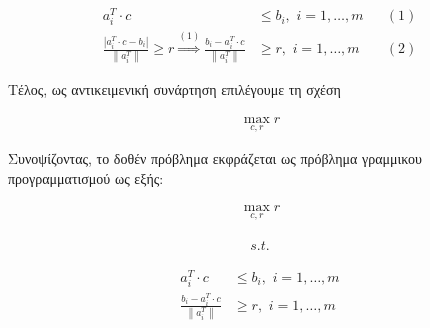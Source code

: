 \documentclass[12pt]{article}
\newcommand{\centered}[1]{\begin{align*}#1\end{align*}}
\newcommand{\margin}{\hspace{4pt}}
\newcommand{\norm}[1]{\left\lVert#1\right\rVert}
\newcommand{\abs}[1]{\left\lvert#1\right\rvert}
\begin{document}
\begin{align*}
    a^{T}_{i} \cdot c & \leq b_i, \margin i = 1, \dotsc, m && (1)\\
    \frac{\abs{a^{T}_{i} \cdot c - b_i}}{\norm{a^{T}_{i}}} \geq r
    \stackrel{(1)}{\Rightarrow}\frac{b_i - a^{T}_{i} \cdot c}{\norm{a^{T}_{i}}} & \geq r, \margin i = 1, \dotsc, m&& (2)
\end{align*}

Τέλος, ως αντικειμενική συνάρτηση επιλέγουμε τη σχέση

\centered{\max_{c, r} r}

Συνοψίζοντας, το δοθέν πρόβλημα εκφράζεται ως πρόβλημα γραμμικου προγραμματισμού ως εξής:

\centered{\max_{c, r} r}

\centered{s.t.}

\begin{align*}
    a^{T}_{i} \cdot c & \leq b_i, \margin i = 1, \dotsc, m \\
    \frac{b_i - a^{T}_{i} \cdot c}{\norm{a^{T}_{i}}} & \geq r, \margin i = 1, \dotsc, m
\end{align*}

\pagebreak
\end{document}
